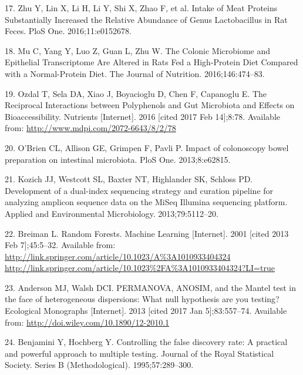 \documentclass[12pt,]{article}
\begin{document}
\hypertarget{ref-zhu_intake_2016}{}
17. Zhu Y, Lin X, Li H, Li Y, Shi X, Zhao F, et al. Intake of Meat
Proteins Substantially Increased the Relative Abundance of Genus
Lactobacillus in Rat Feces. PloS One. 2016;11:e0152678.

\hypertarget{ref-mu_colonic_2016}{}
18. Mu C, Yang Y, Luo Z, Guan L, Zhu W. The Colonic Microbiome and
Epithelial Transcriptome Are Altered in Rats Fed a High-Protein Diet
Compared with a Normal-Protein Diet. The Journal of Nutrition.
2016;146:474--83.

\hypertarget{ref-ozdal_reciprocal_2016}{}
19. Ozdal T, Sela DA, Xiao J, Boyacioglu D, Chen F, Capanoglu E. The
Reciprocal Interactions between Polyphenols and Gut Microbiota and
Effects on Bioaccessibility. Nutrients {[}Internet{]}. 2016 {[}cited
2017 Feb 14{]};8:78. Available from:
\url{http://www.mdpi.com/2072-6643/8/2/78}

\hypertarget{ref-obrien_impact_2013}{}
20. O'Brien CL, Allison GE, Grimpen F, Pavli P. Impact of colonoscopy
bowel preparation on intestinal microbiota. PloS One. 2013;8:e62815.

\hypertarget{ref-kozich_development_2013}{}
21. Kozich JJ, Westcott SL, Baxter NT, Highlander SK, Schloss PD.
Development of a dual-index sequencing strategy and curation pipeline
for analyzing amplicon sequence data on the MiSeq Illumina sequencing
platform. Applied and Environmental Microbiology. 2013;79:5112--20.

\hypertarget{ref-breiman_random_2001}{}
22. Breiman L. Random Forests. Machine Learning {[}Internet{]}. 2001
{[}cited 2013 Feb 7{]};45:5--32. Available from:
\href{http://link.springer.com/article/10.1023/A\%3A1010933404324\%20http://link.springer.com/article/10.1023\%2FA\%3A1010933404324?LI=true}{http://link.springer.com/article/10.1023/A\%3A1010933404324 http://link.springer.com/article/10.1023\%2FA\%3A1010933404324?LI=true}

\hypertarget{ref-anderson_permanova_2013}{}
23. Anderson MJ, Walsh DCI. PERMANOVA, ANOSIM, and the Mantel test in
the face of heterogeneous dispersions: What null hypothesis are you
testing? Ecological Monographs {[}Internet{]}. 2013 {[}cited 2017 Jan
5{]};83:557--74. Available from:
\url{http://doi.wiley.com/10.1890/12-2010.1}

\hypertarget{ref-benjamini_controlling_1995}{}
24. Benjamini Y, Hochberg Y. Controlling the false discovery rate: A
practical and powerful approach to multiple testing. Journal of the
Royal Statistical Society. Series B (Methodological). 1995;57:289--300.
\end{document}

